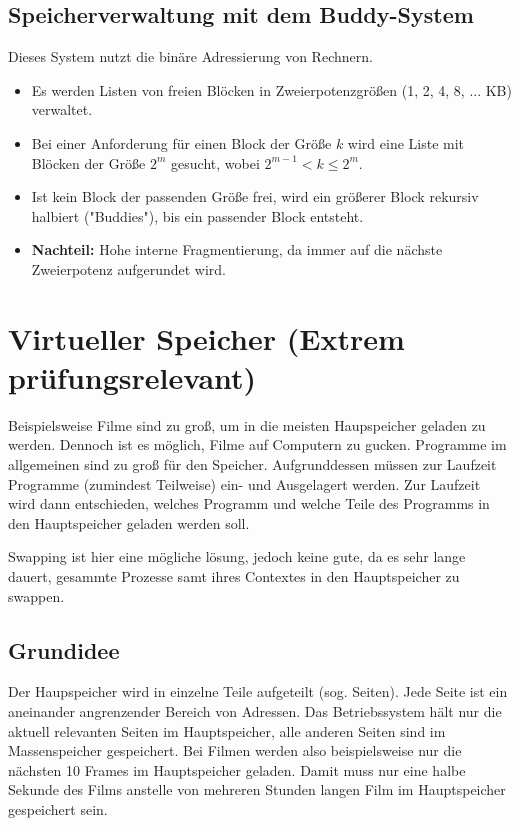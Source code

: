 \subsection{Speicherverwaltung mit dem Buddy-System}
Dieses System nutzt die binäre Adressierung von Rechnern.
\begin{itemize}
    \item Es werden Listen von freien Blöcken in Zweierpotenzgrößen (1, 2, 4, 8, ... KB) verwaltet.
    \item Bei einer Anforderung für einen Block der Größe $k$ wird eine Liste mit Blöcken der Größe $2^m$ gesucht, wobei $2^{m-1} < k \le 2^m$.
    \item Ist kein Block der passenden Größe frei, wird ein größerer Block rekursiv halbiert ("Buddies"), bis ein passender Block entsteht.
    \item \textbf{Nachteil:} Hohe interne Fragmentierung, da immer auf die nächste Zweierpotenz aufgerundet wird.
\end{itemize}

\section{Virtueller Speicher (Extrem prüfungsrelevant)}

Beispielsweise Filme sind zu groß, um in die meisten Haupspeicher geladen zu werden. Dennoch ist es möglich, Filme auf Computern zu gucken. Programme im allgemeinen sind zu groß für den Speicher. Aufgrunddessen müssen zur Laufzeit Programme (zumindest Teilweise) ein- und Ausgelagert werden. Zur Laufzeit wird dann entschieden, welches Programm und welche Teile des Programms in den Hauptspeicher geladen werden soll. 

Swapping ist hier eine mögliche lösung, jedoch keine gute, da es sehr lange dauert, gesammte Prozesse samt ihres Contextes in den Hauptspeicher zu swappen.

\subsection{Grundidee}

Der Haupspeicher wird in einzelne Teile aufgeteilt (sog. Seiten). Jede Seite ist ein aneinander angrenzender Bereich von Adressen. Das Betriebssystem hält nur die aktuell relevanten Seiten im Hauptspeicher, alle anderen Seiten sind im Massenspeicher gespeichert. Bei Filmen werden also beispielsweise nur die nächsten 10 Frames im Hauptspeicher geladen. Damit muss nur eine halbe Sekunde des Films anstelle von mehreren Stunden langen Film im Hauptspeicher gespeichert sein.

